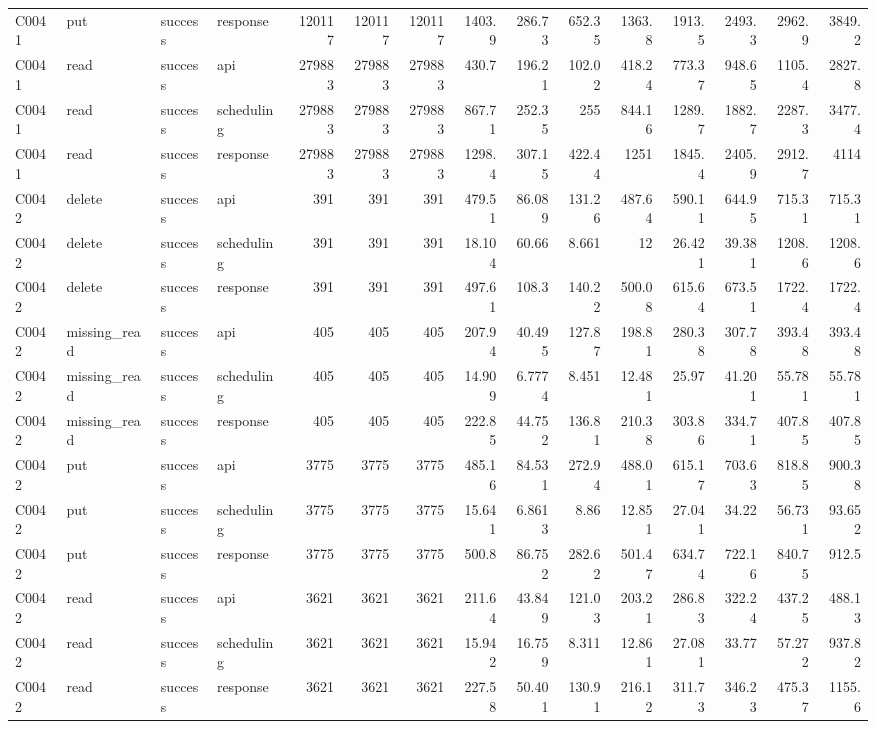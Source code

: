\begin{landscape}
\begin{longtable}{llllrrrrrrrrrrr}
C0041 & put & success & response & 120117 & 120117 & 120117 & 1403.9 & 286.73 & 652.35 & 1363.8 & 1913.5 & 2493.3 & 2962.9 & 3849.2\\
C0041 & read & success & api & 279883 & 279883 & 279883 & 430.7 & 196.21 & 102.02 & 418.24 & 773.37 & 948.65 & 1105.4 & 2827.8\\
C0041 & read & success & scheduling & 279883 & 279883 & 279883 & 867.71 & 252.35 & 255 & 844.16 & 1289.7 & 1882.7 & 2287.3 & 3477.4\\
C0041 & read & success & response & 279883 & 279883 & 279883 & 1298.4 & 307.15 & 422.44 & 1251 & 1845.4 & 2405.9 & 2912.7 & 4114\\
C0042 & delete & success & api & 391 & 391 & 391 & 479.51 & 86.089 & 131.26 & 487.64 & 590.11 & 644.95 & 715.31 & 715.31\\
C0042 & delete & success & scheduling & 391 & 391 & 391 & 18.104 & 60.66 & 8.661 & 12 & 26.421 & 39.381 & 1208.6 & 1208.6\\
C0042 & delete & success & response & 391 & 391 & 391 & 497.61 & 108.3 & 140.22 & 500.08 & 615.64 & 673.51 & 1722.4 & 1722.4\\
C0042 & missing\_\allowbreak{}read & success & api & 405 & 405 & 405 & 207.94 & 40.495 & 127.87 & 198.81 & 280.38 & 307.78 & 393.48 & 393.48\\
C0042 & missing\_\allowbreak{}read & success & scheduling & 405 & 405 & 405 & 14.909 & 6.7774 & 8.451 & 12.481 & 25.97 & 41.201 & 55.781 & 55.781\\
C0042 & missing\_\allowbreak{}read & success & response & 405 & 405 & 405 & 222.85 & 44.752 & 136.81 & 210.38 & 303.86 & 334.71 & 407.85 & 407.85\\
C0042 & put & success & api & 3775 & 3775 & 3775 & 485.16 & 84.531 & 272.94 & 488.01 & 615.17 & 703.63 & 818.85 & 900.38\\
C0042 & put & success & scheduling & 3775 & 3775 & 3775 & 15.641 & 6.8613 & 8.86 & 12.851 & 27.041 & 34.22 & 56.731 & 93.652\\
C0042 & put & success & response & 3775 & 3775 & 3775 & 500.8 & 86.752 & 282.62 & 501.47 & 634.74 & 722.16 & 840.75 & 912.5\\
C0042 & read & success & api & 3621 & 3621 & 3621 & 211.64 & 43.849 & 121.03 & 203.21 & 286.83 & 322.24 & 437.25 & 488.13\\
C0042 & read & success & scheduling & 3621 & 3621 & 3621 & 15.942 & 16.759 & 8.311 & 12.861 & 27.081 & 33.77 & 57.272 & 937.82\\
C0042 & read & success & response & 3621 & 3621 & 3621 & 227.58 & 50.401 & 130.91 & 216.12 & 311.73 & 346.23 & 475.37 & 1155.6\\

\end{longtable}
\end{landscape}
